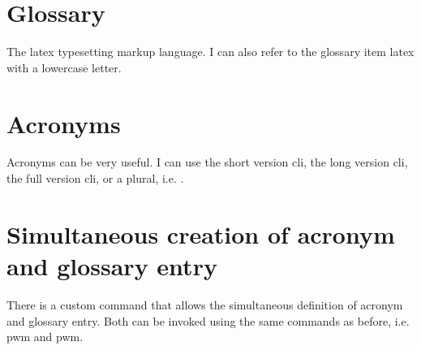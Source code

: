 \section{Glossary}

The \Gls{latex} typesetting markup language. I can also refer to the glossary item \gls{latex} with a lowercase letter.

\section{Acronyms}

Acronyms can be very useful. I can use the short version \acrshort{cli}, the long version \acrlong{cli}, the full version \acrfull{cli}, or a plural, i.e. .

\section{Simultaneous creation of acronym and glossary entry}

There is a custom command that allows the simultaneous definition of acronym and glossary entry. Both can be invoked using the same commands as before, i.e. \gls{pwm} and \acrlong{pwm}.